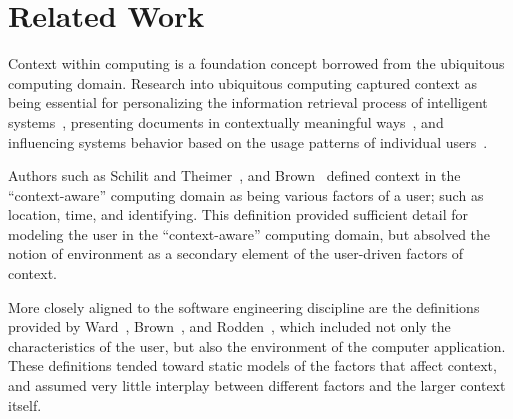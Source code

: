 
\section{Related Work}

Context within computing is a foundation concept borrowed from the ubiquitous computing domain. Research into ubiquitous computing captured context as being essential for personalizing the information retrieval process of intelligent systems~\cite{Freeman:1996}, presenting documents in contextually meaningful ways~\cite{Dourish:2000}, and influencing systems behavior based on the usage patterns of individual users~\cite{Cheverst:2000}. 

Authors such as Schilit and Theimer~\cite{Schilit:1994b}, and Brown~\cite{Brown:1995} defined context in the ``context-aware'' computing domain as being various factors of a user; such as location, time, and identifying. This definition provided sufficient detail for modeling the user in the ``context-aware'' computing domain, but absolved the notion of environment as a secondary element of the user-driven factors of context.


More closely aligned to the software engineering discipline are the definitions provided by Ward~\cite{Ward:1997}, Brown~\cite{Brown:1995}, and Rodden~\cite{Rodden:1998}, which included not only the characteristics of the user, but also the environment of the computer application. These definitions tended toward static models of the factors that affect context, and assumed very little interplay between different factors and the larger context itself.


